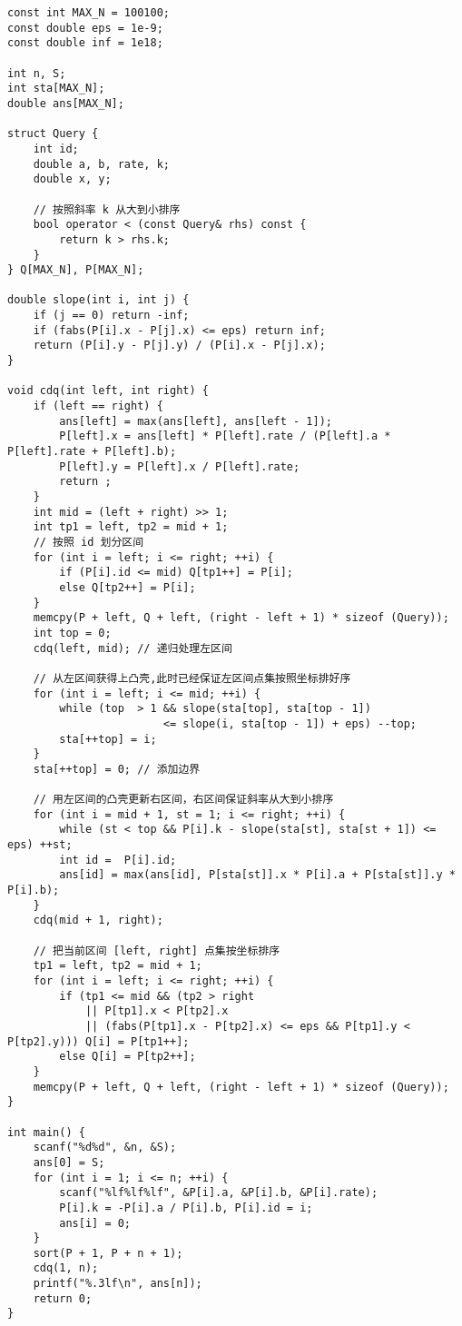 \begin{lstlisting}
const int MAX_N = 100100;
const double eps = 1e-9;
const double inf = 1e18;

int n, S;
int sta[MAX_N];
double ans[MAX_N];

struct Query {
	int id;
	double a, b, rate, k;
	double x, y;
	
	// 按照斜率 k 从大到小排序
	bool operator < (const Query& rhs) const {
		return k > rhs.k;
	}
} Q[MAX_N], P[MAX_N];

double slope(int i, int j) {
	if (j == 0) return -inf;
	if (fabs(P[i].x - P[j].x) <= eps) return inf;
	return (P[i].y - P[j].y) / (P[i].x - P[j].x);
}

void cdq(int left, int right) {
	if (left == right) {
		ans[left] = max(ans[left], ans[left - 1]);
		P[left].x = ans[left] * P[left].rate / (P[left].a * P[left].rate + P[left].b);
		P[left].y = P[left].x / P[left].rate;
		return ;
	}
	int mid = (left + right) >> 1;
	int tp1 = left, tp2 = mid + 1;
	// 按照 id 划分区间
	for (int i = left; i <= right; ++i) {
		if (P[i].id <= mid) Q[tp1++] = P[i];
		else Q[tp2++] = P[i];
	}
	memcpy(P + left, Q + left, (right - left + 1) * sizeof (Query));
	int top = 0;
	cdq(left, mid); // 递归处理左区间
	
	// 从左区间获得上凸壳,此时已经保证左区间点集按照坐标排好序
	for (int i = left; i <= mid; ++i) {
		while (top  > 1 && slope(sta[top], sta[top - 1])
                        <= slope(i, sta[top - 1]) + eps) --top;
		sta[++top] = i;
	}
	sta[++top] = 0; // 添加边界
	
	// 用左区间的凸壳更新右区间，右区间保证斜率从大到小排序
	for (int i = mid + 1, st = 1; i <= right; ++i) {
		while (st < top && P[i].k - slope(sta[st], sta[st + 1]) <= eps) ++st;
		int id =  P[i].id;
		ans[id] = max(ans[id], P[sta[st]].x * P[i].a + P[sta[st]].y * P[i].b);
	}
	cdq(mid + 1, right);

	// 把当前区间 [left, right] 点集按坐标排序
	tp1 = left, tp2 = mid + 1;
	for (int i = left; i <= right; ++i) {
		if (tp1 <= mid && (tp2 > right
			|| P[tp1].x < P[tp2].x
			|| (fabs(P[tp1].x - P[tp2].x) <= eps && P[tp1].y < P[tp2].y))) Q[i] = P[tp1++];
		else Q[i] = P[tp2++];
	}
	memcpy(P + left, Q + left, (right - left + 1) * sizeof (Query));
}

int main() {
	scanf("%d%d", &n, &S);
	ans[0] = S;
	for (int i = 1; i <= n; ++i) {
		scanf("%lf%lf%lf", &P[i].a, &P[i].b, &P[i].rate);
		P[i].k = -P[i].a / P[i].b, P[i].id = i;
		ans[i] = 0;
	}
	sort(P + 1, P + n + 1);
	cdq(1, n);
	printf("%.3lf\n", ans[n]);
	return 0;
}
\end{lstlisting}
